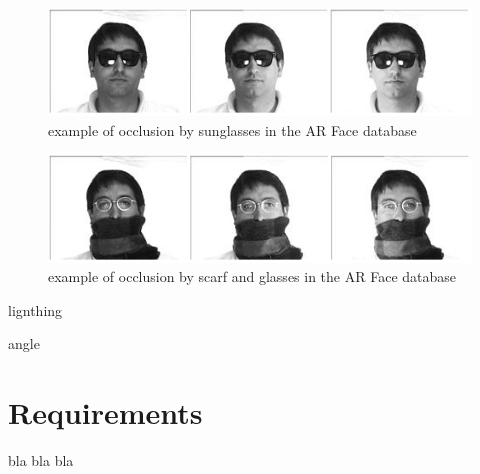 \vspace{\baselineskip}
\begin{figure}[!h]
\begin{center}
\noindent \includegraphics[scale=0.7]{figures/arface_example2} 
\newline
\caption{example of occlusion by sunglasses in the AR Face database}
\label{arface_example2}
\end{center} 
\end{figure}

\vspace{\baselineskip}
\begin{figure}[!h]
\begin{center}
\noindent \includegraphics[scale=0.7]{figures/arface_example3} 
\newline
\caption{example of occlusion by scarf and glasses in the AR Face database}
\label{arface_example3}
\end{center} 
\end{figure} 

\noindent lignthing
\newline

\noindent angle
\newline

\section{Requirements}

\vspace{\baselineskip}
\noindent bla bla bla
\newline


